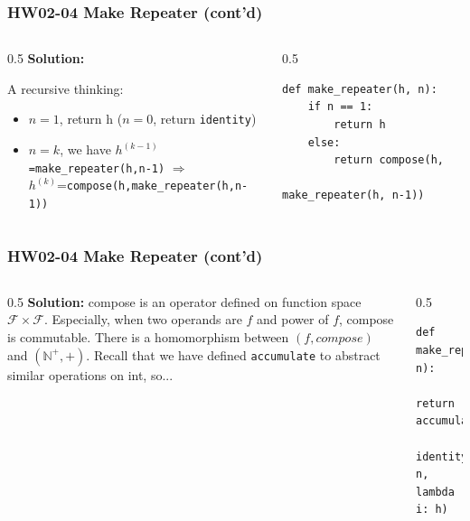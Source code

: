 \documentclass[aspectratio=169]{beamer}
\begin{document}
\begin{frame}[fragile]
\frametitle{HW02-04 Make Repeater (cont'd)}

\begin{columns}
\begin{column}{0.5\textwidth}
\textbf{Solution:} 
\small{
A recursive thinking:
\begin{itemize}
    \item $n=1$, return h ($n=0$, return \texttt{identity})
    \item $n=k$, we have $h^{(k-1)} $\texttt{=make_repeater(h,n-1)} $\Rightarrow$ \\ $h^{(k)}$=\texttt{compose(h,make_repeater(h,n-1))}
\end{itemize}
}
\end{column}

\begin{column}{0.5\textwidth}  
\begin{verbatim}
def make_repeater(h, n):
    if n == 1: 
        return h
    else:
        return compose(h, 
            make_repeater(h, n-1))
\end{verbatim}
\end{column}
\end{columns}

\end{frame}


\begin{frame}[fragile]
\frametitle{HW02-04 Make Repeater (cont'd)}

\begin{columns}
\begin{column}{0.5\textwidth}
\textbf{Solution:} compose is an operator defined on function space $\mathcal{F}\times\mathcal{F}$. Especially, when two operands are $f$ and power of $f$, compose is commutable. There is a homomorphism between $(f, compose)$ and $(\mathbb{N}^+, +)$. Recall that we have defined \texttt{accumulate} to abstract similar operations on int, so... 
\end{column}

\begin{column}{0.5\textwidth}  
\begin{verbatim}
def make_repeater(h, n):
    return accumulate(compose, 
      identity, n, lambda i: h)
\end{verbatim}
\end{column}
\end{columns}

\end{frame}
\end{document}
